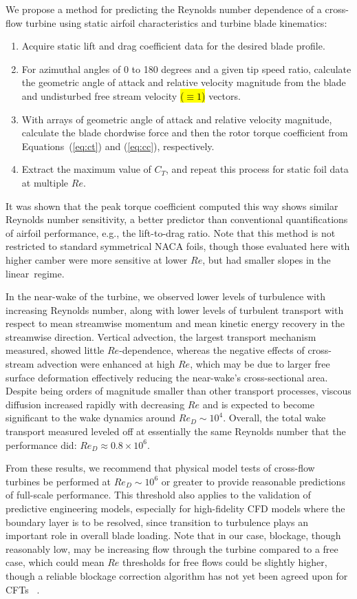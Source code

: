 \documentclass[energies,article,accept,moreauthors,pdftex,10pt,a4paper]{mdpi}
\theoremstyle{mdpi}
\newcounter{thm}
\newcounter{ex}
\newcounter{re}
\begin{document}
We propose a method for predicting the Reynolds number dependence of a cross-flow
turbine using static airfoil characteristics and turbine blade kinematics:
\begin{enumerate}
\item Acquire static lift and drag coefficient data for the desired blade
 profile.
\item For azimuthal angles of 0 to 180 degrees and a given tip speed ratio,
 calculate the geometric angle of attack and relative velocity magnitude from
 the blade and undisturbed free stream velocity \hl {($\equiv 1$)} vectors.
\item With arrays of geometric angle of attack and relative velocity
 magnitude, calculate the blade chordwise force and then the rotor torque
 coefficient from Equations~(\ref{eq:ct}) and (\ref{eq:cc}), respectively.
\item Extract the maximum value of $C_T$, and repeat this process for static
 foil data at multiple $Re$.
\end{enumerate}

It was shown that the peak torque coefficient computed this way shows similar
Reynolds number sensitivity, a better predictor than conventional
quantifications of airfoil performance, e.g., the lift-to-drag ratio. Note that this
method is not restricted to standard symmetrical NACA foils, though those
evaluated here with higher camber were more sensitive at lower $Re$, but had
smaller slopes in the linear~regime.

In the near-wake of the turbine, we observed lower levels of turbulence with
increasing Reynolds number, along with lower levels of turbulent transport with
respect to mean streamwise momentum and mean kinetic energy recovery in the
streamwise direction. Vertical advection, the largest transport mechanism
measured, showed little $Re$-dependence, whereas the negative effects of
cross-stream advection were enhanced at high $Re$, which may be due to larger
free surface deformation effectively reducing the near-wake's cross-sectional
area. Despite being orders of magnitude smaller than other transport processes,
viscous diffusion increased rapidly with decreasing $Re$ and is expected to
become significant to the wake dynamics around $Re_D \sim 10^4$. Overall, the
total wake transport measured leveled off at essentially the same Reynolds
number that the performance did: $Re_D \approx 0.8 \times 10^6$.

From these results, we recommend that physical model tests of cross-flow turbines
be performed at $Re_D \sim 10^6$ or greater to provide reasonable predictions of
full-scale performance. This threshold also applies to the validation of
predictive engineering models, especially for high-fidelity CFD models where the
boundary layer is to be resolved, since transition to turbulence plays an
important role in overall blade loading. Note that in our case, blockage, though
reasonably low, may be increasing flow through the turbine compared to a free
case, which could mean $Re$ thresholds for free flows could be slightly higher,
though a reliable blockage correction algorithm has not yet been agreed upon for
CFTs~ \cite{Cavagnaro2014}.
\end{document}

